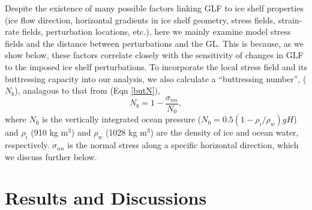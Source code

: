 \documentclass[review,oneside]{igs}
\begin{document}
Despite the existence of many possible factors linking GLF to ice shelf properties (ice flow direction, horizontal gradients in ice shelf geometry, stress fields, strain-rate fields, perturbation locations, etc.), here we mainly examine model stress fields and the distance between perturbations and the GL. This is because, as we show below, these factors correlate closely with the sensitivity of changes in GLF to the imposed ice shelf perturbations. To incorporate the local stress field and its buttressing capacity into our analysis, we also calculate a ``buttressing number'', ($N_b$), analagous to that from \cite{furst2016} (Eqn \ref{butN}),
\begin{equation}
N_b=1-\frac{\sigma_{nn}}{N_0},
\label{butN}
\end{equation}
where $N_0$ is the vertically integrated ocean pressure ($N_0=0.5\left(1-{\rho_i}/{\rho_w}\right)gH$) and $\rho_i$ (910 kg m$^3$) and $\rho_w$ (1028 kg m$^3$) are the density of ice and ocean water, respectively. $\sigma_{nn}$ is the normal stress along a specific horizontal direction, which we discuss further below.

%

\section{Results and Discussions}
\end{document}

